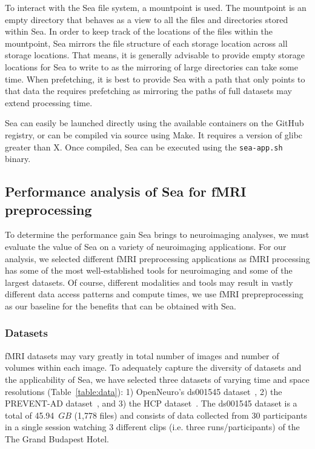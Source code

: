     To interact with the Sea file system, a mountpoint is used. The mountpoint is an empty directory that behaves as a view to
    all the files and directories stored within Sea. In order to keep track of the locations of the files within the mountpoint, Sea
    mirrors the file structure of each storage location across all storage locations. That means, it is generally advisable to provide
    empty storage locations for Sea to write to as the mirroring of large directories can take some time. When prefetching, it is
    best to provide Sea with a path that only points to that data the requires prefetching as mirroring the paths of full datasets may 
    extend processing time.
    
    Sea can easily be launched directly using the available containers on the GitHub registry, or can be compiled via source using Make.
    It requires a version of glibc greater than X. Once compiled, Sea can be executed using the \texttt{sea-app.sh} binary.
    
    \subsection{Performance analysis of Sea for fMRI preprocessing}
    
    To determine the performance gain Sea brings to neuroimaging analyses, we must evaluate the value of Sea on a variety of neuroimaging
    applications. For our analysis, we selected different fMRI preprocessing applications as fMRI processing has some of the most
    well-established tools for neuroimaging and some of the largest datasets. Of course, different modalities and tools may result in
    vastly different data access patterns and compute times, we use fMRI prepreprocessing as our baseline for the benefits that can be
    obtained with Sea. 
    
    
    
    \subsubsection{Datasets}
    fMRI datasets may vary greatly in total number
    of images and number of volumes within each image. To adequately capture the 
    diversity of datasets and the applicability of Sea, we have selected three datasets of varying
    time and space resolutions (Table~\ref{table:data}): 1) OpenNeuro's ds001545 dataset~\cite{ds001545},
    2) the PREVENT-AD dataset~\cite{preventad}, and 3) the HCP dataset~\cite{HCP}.
    The ds001545 dataset is a total of 45.94~$GB$ (1,778 files) and consists of data collected
    from 30 participants in a single session watching 3 different clips (i.e. three runs/participants) of the The Grand Budapest Hotel.
    
